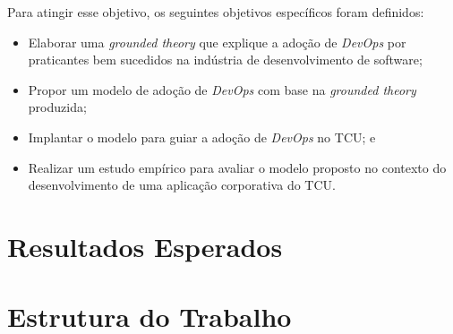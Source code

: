 Para atingir esse objetivo, os seguintes objetivos específicos foram definidos:

\begin{itemize}
\item Elaborar uma \textit{grounded theory} que explique a adoção
de \textit{DevOps} por praticantes bem sucedidos na indústria de desenvolvimento
de software;
\item Propor um modelo de adoção de \textit{DevOps} com base na
\textit{grounded theory} produzida;
\item Implantar o modelo para guiar a adoção de \textit{DevOps} no \acrshort{TCU}; e
\item Realizar um estudo empírico para avaliar o modelo proposto no contexto
do desenvolvimento de uma aplicação corporativa do \acrshort{TCU}.
\end{itemize}

\section{Resultados Esperados}

\section{Estrutura do Trabalho}



